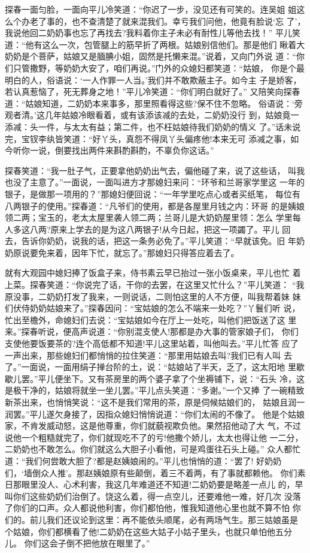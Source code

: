 探春一面匀脸，一面向平儿冷笑道：“你迟了一步，没见还有可笑的。连吴姐
姐这么个办老了事的，也不查清楚了就来混我们。幸亏我们问他，他竟有脸说‘忘
了’，我说他回二奶奶事也忘了再找去?我料着你主子未必有耐性儿等他去找！”
平儿笑道：“他有这么一次，包管腿上的筋早折了两根。姑娘别信他们。那是他们
瞅着大奶奶是个菩萨，姑娘又是腼腆小姐，固然是托懒来混。”说着，又向门外说
道：“你们只管撒野，等奶奶大安了，咱们再说。”门外的众媳妇都笑道：“姑娘，
你是个最明白的人，俗语说：‘一人作罪一人当。’我们并不敢欺蔽主子。如今主
子是娇客，若认真惹恼了，死无葬身之地！”平儿冷笑道：“你们明白就好了。”
又陪笑向探春道：“姑娘知道，二奶奶本来事多，那里照看得这些?保不住不忽略。
俗语说：‘旁观者清。’这几年姑娘冷眼看着，或有该添该减的去处，二奶奶没行
到，姑娘竟一添减：头一件，与太太有益；第二件，也不枉姑娘待我们奶奶的情义
了。”话未说完，宝钗李纨皆笑道：“好丫头，真怨不得凤丫头偏疼他!本来无可
添减之事，如今听你一说，倒要找出两件来斟酌斟酌，不辜负你这话。”

探春笑道：“我一肚子气，正要拿他奶奶出气去，偏他碰了来，说了这些话，
叫我也没了主意了。”一面说，一面叫进方才那媳妇来问：“环爷和兰哥家学里这
一年的银子，是做那一项用的？”那媳妇便回说：“一年学里吃点心或者买纸笔，
每位有八两银子的使用。”探春道：“凡爷们的使用，都是各屋里月钱之内：环哥
的是姨娘领二两；宝玉的，老太太屋里袭人领二两；兰哥儿是大奶奶屋里领：怎么
学里每人多这八两?原来上学去的是为这八两银子!从今日起，把这一项蠲了。平儿
回去，告诉你奶奶，说我的话，把这一条务必免了。”平儿笑道：“早就该免。旧
年奶奶原说要免来着，因年下忙，就忘了。”那媳妇只得答应着去了。

就有大观园中媳妇捧了饭盒子来，侍书素云早已抬过一张小饭桌来，平儿也忙
着上菜。探春笑道：“你说完了话，干你的去罢，在这里又忙什么？”平儿笑道：
“我原没事，二奶奶打发了我来，一则说话，二则怕这里的人不方便，叫我帮着妹
妹们伏侍奶奶姑娘来了。”探春因问：“宝姑娘的怎么不端来一处吃？”丫鬟们听
说，忙出至檐外，命媳妇们去说：“宝姑娘如今在厅上一处吃，叫他们把饭送了这
里来。”探春听说，便高声说道：“你别混支使人!那都是办大事的管家娘子们，
你们支使他要饭要茶的?连个高低都不知道!平儿这里站着，叫他叫去。”平儿忙答
应了一声出来，那些媳妇们都悄悄的拉住笑道：“那里用姑娘去叫?我们已有人叫
去了。”一面说，一面用绢子掸台阶的土，说：“姑娘站了半天，乏了，这太阳地
里歇歇儿罢。”平儿便坐下。又有茶房里的两个婆子拿了个坐褥铺下，说：“石头
冷，这是极干净的，姑娘将就坐一坐儿罢。”平儿点头笑道：“多谢。”一个又捧
了一碗精致新茶出来，也悄悄笑说：“这不是我们常用的茶，原是伺候姑娘们的，
姑娘且润一润罢。”平儿遂欠身接了，因指众媳妇悄悄说道：“你们太闹的不像了。
他是个姑娘家，不肯发威动怒，这是他尊重，你们就藐视欺负他。果然招他动了大
气，不过说他一个粗糙就完了，你们就现吃不了的亏!他撒个娇儿，太太也得让他
一二分，二奶奶也不敢怎么。你们就这么大胆子小看他，可是鸡蛋往石头上碰。”
众人都忙道：“我们何尝敢大胆了?都是赵姨娘闹的。”平儿也悄悄的道：“罢了!
好奶奶们，‘墙倒众人推’。那赵姨娘原有些颠倒，着三不着两，有了事就都赖他。
你们素日那眼里没人、心术利害，我这几年难道还不知道!二奶奶要是略差一点儿
的，早叫你们这些奶奶们治倒了。饶这么着，得一点空儿，还要难他一难，好几次
没落了你们的口声。众人都说他利害，你们都怕他，惟我知道他心里也就不算不怕
你们的。前儿我们还议论到这里：再不能依头顺尾，必有两场气生。那三姑娘虽是
个姑娘，你们都横看了他!二奶奶在这些大姑子小姑子里头，也就只单怕他五分儿。
你们这会子倒不把他放在眼里了。”

